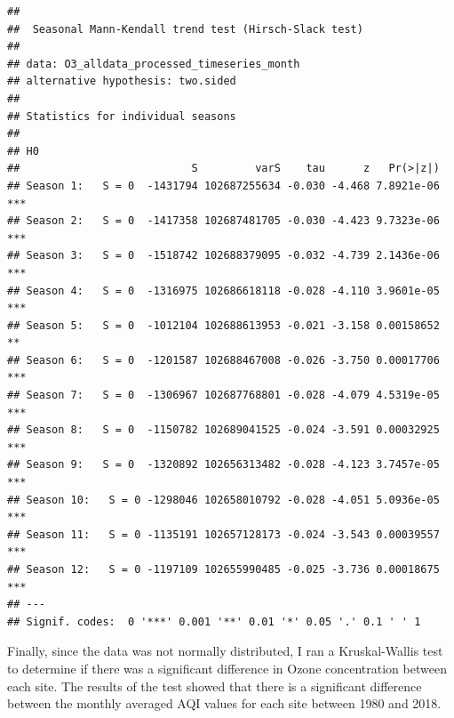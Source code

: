 \documentclass[12pt,]{article}
\newenvironment{Shaded}{\begin{snugshade}}{\end{snugshade}}
\newcommand{\KeywordTok}[1]{\textcolor[rgb]{0.13,0.29,0.53}{\textbf{#1}}}
\newcommand{\DataTypeTok}[1]{\textcolor[rgb]{0.13,0.29,0.53}{#1}}
\newcommand{\DecValTok}[1]{\textcolor[rgb]{0.00,0.00,0.81}{#1}}
\newcommand{\StringTok}[1]{\textcolor[rgb]{0.31,0.60,0.02}{#1}}
\newcommand{\OperatorTok}[1]{\textcolor[rgb]{0.81,0.36,0.00}{\textbf{#1}}}
\newcommand{\NormalTok}[1]{#1}
\begin{document}
\begin{Shaded}
\end{Shaded}

\begin{verbatim}
## 
##  Seasonal Mann-Kendall trend test (Hirsch-Slack test)
## 
## data: O3_alldata_processed_timeseries_month
## alternative hypothesis: two.sided
## 
## Statistics for individual seasons
## 
## H0
##                           S         varS    tau      z   Pr(>|z|)    
## Season 1:   S = 0  -1431794 102687255634 -0.030 -4.468 7.8921e-06 ***
## Season 2:   S = 0  -1417358 102687481705 -0.030 -4.423 9.7323e-06 ***
## Season 3:   S = 0  -1518742 102688379095 -0.032 -4.739 2.1436e-06 ***
## Season 4:   S = 0  -1316975 102686618118 -0.028 -4.110 3.9601e-05 ***
## Season 5:   S = 0  -1012104 102688613953 -0.021 -3.158 0.00158652  **
## Season 6:   S = 0  -1201587 102688467008 -0.026 -3.750 0.00017706 ***
## Season 7:   S = 0  -1306967 102687768801 -0.028 -4.079 4.5319e-05 ***
## Season 8:   S = 0  -1150782 102689041525 -0.024 -3.591 0.00032925 ***
## Season 9:   S = 0  -1320892 102656313482 -0.028 -4.123 3.7457e-05 ***
## Season 10:   S = 0 -1298046 102658010792 -0.028 -4.051 5.0936e-05 ***
## Season 11:   S = 0 -1135191 102657128173 -0.024 -3.543 0.00039557 ***
## Season 12:   S = 0 -1197109 102655990485 -0.025 -3.736 0.00018675 ***
## ---
## Signif. codes:  0 '***' 0.001 '**' 0.01 '*' 0.05 '.' 0.1 ' ' 1
\end{verbatim}

Finally, since the data was not normally distributed, I ran a
Kruskal-Wallis test to determine if there was a significant difference
in Ozone concentration between each site. The results of the test showed
that there is a significant difference between the monthly averaged AQI
values for each site between 1980 and 2018.

\begin{Shaded}
\end{Shaded}
\end{document}

